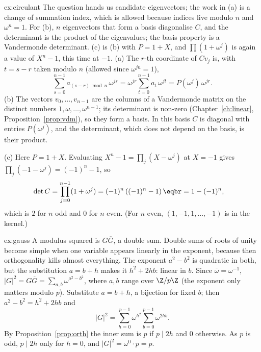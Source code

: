 \begin{solution}{ex:circulant}
\idea The question hands us candidate eigenvectors; the work in (a) is a change of summation index, which is allowed because indices live modulo $n$ and $\omega^n=1$. For (b), $n$ eigenvectors that form a basis diagonalise $C$, and the determinant is the product of the eigenvalues; the basis property is a Vandermonde determinant. (c) is (b) with $P=1+X$, and $\prod(1+\omega^j)$ is again a value of $X^n-1$, this time at $-1$.
\writeup (a) The $r$-th coordinate of $Cv_j$ is, with $t=s-r$ taken modulo $n$ (allowed since $\omega^{jn}=1$),
\[
\sum_{s=0}^{n-1}a_{(s-r)\bmod n}\,\omega^{js}=\omega^{jr}\sum_{t=0}^{n-1}a_t\,\omega^{jt}=P(\omega^j)\,\omega^{jr}.
\]
(b) The vectors $v_0,\dots,v_{n-1}$ are the columns of a Vandermonde matrix on the distinct numbers $1,\omega,\dots,\omega^{n-1}$; its determinant is non-zero (Chapter~\ref{ch:linear}, Proposition~\ref{prop:vdm}),
so they form a basis. In this basis $C$ is diagonal with entries $P(\omega^j)$, and the determinant, which does not depend on the basis, is their product.

(c) Here $P=1+X$. Evaluating $X^n-1=\prod_j(X-\omega^j)$ at $X=-1$ gives $\prod_j(-1-\omega^j)=(-1)^n-1$, so
\[
\begin{aligned}\det C&=\prod_{j=0}^{n-1}(1+\omega^j)=(-1)^n\left((-1)^n-1\right)\eqbr=1-(-1)^n,\end{aligned}
\]
which is $2$ for $n$ odd and $0$ for $n$ even. (For $n$ even, $(1,-1,1,\dots,-1)$ is in the kernel.)
\end{solution}

\begin{solution}{ex:gauss}
\idea A modulus squared is $G\overline G$, a double sum. Double sums of roots of unity become simple when one variable appears linearly in the exponent, because then orthogonality kills almost everything. The exponent $a^2-b^2$ is quadratic in both, but the substitution $a=b+h$ makes it $h^2+2hb$: linear in $b$.
\writeup Since $\overline\omega=\omega^{-1}$, $|G|^2=G\overline G=\sum_{a,b}\omega^{a^2-b^2}$, where $a,b$ range over $\Z/p\Z$
(the exponent only matters modulo $p$). Substitute $a=b+h$, a bijection for fixed $b$; then $a^2-b^2=h^2+2hb$ and
\[
|G|^2=\sum_{h=0}^{p-1}\omega^{h^2}\sum_{b=0}^{p-1}\omega^{2hb}.
\]
By Proposition~\ref{prop:orth} the inner sum is $p$ if $p\mid2h$ and $0$ otherwise. As $p$ is odd, $p\mid2h$ only for
$h=0$, and $|G|^2=\omega^0\cdot p=p$.
\end{solution}

